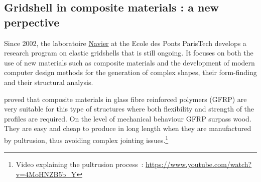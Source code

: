 
\subsection{Gridshell in composite materials : a new perpective}
Since 2002, the laboratoire \href{http://navier.enpc.fr}{Navier} at the Ecole des Ponts ParisTech develops a research program on elastic gridshells that is still ongoing. It focuses on both the use of new materials such as composite materials and the development of modern computer design methods for the generation of complex shapes, their form-finding and their structural analysis.

\citet{Douthe2010a} proved that composite materials in glass fibre reinforced polymers (GFRP) are very suitable for this type of structures where both flexibility and strength of the profiles are required. On the level of mechanical behaviour GFRP surpass wood. They are easy and cheap to produce in long length when they are manufactured by pultrusion, thus avoiding complex jointing issues.\footnote{Video explaining the pultrusion process~: \url{https://www.youtube.com/watch?v=4MoHNZB5b_Y}}


